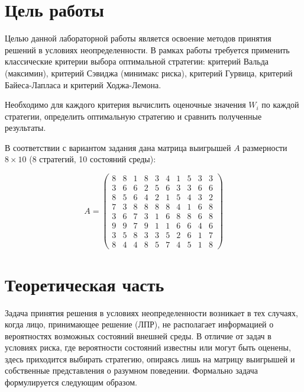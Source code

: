 

\section{Цель работы}

Целью данной лабораторной работы является освоение методов принятия решений в условиях неопределенности. В рамках работы требуется применить классические критерии выбора оптимальной стратегии: критерий Вальда (максимин), критерий Сэвиджа (минимакс риска), критерий Гурвица, критерий Байеса-Лапласа и критерий Ходжа-Лемона.

Необходимо для каждого критерия вычислить оценочные значения $W_i$ по каждой стратегии, определить оптимальную стратегию и сравнить полученные результаты.

В соответствии с вариантом задания дана матрица выигрышей $A$ размерности $8 \times 10$ (8 стратегий, 10 состояний среды):

\[
A = \begin{pmatrix}
8 & 8 & 1 & 8 & 3 & 4 & 1 & 5 & 3 & 3 \\
3 & 6 & 6 & 2 & 5 & 6 & 3 & 3 & 6 & 6 \\
8 & 5 & 6 & 4 & 2 & 1 & 5 & 4 & 3 & 2 \\
7 & 3 & 8 & 8 & 8 & 8 & 4 & 1 & 6 & 8 \\
3 & 6 & 7 & 3 & 1 & 6 & 8 & 8 & 6 & 8 \\
9 & 9 & 7 & 9 & 1 & 1 & 6 & 6 & 4 & 6 \\
3 & 5 & 8 & 3 & 3 & 5 & 2 & 6 & 1 & 7 \\
8 & 4 & 4 & 8 & 5 & 7 & 4 & 5 & 1 & 8
\end{pmatrix}
\]

\clearpage







\section{Теоретическая часть}

Задача принятия решения в условиях неопределенности возникает в тех случаях, когда лицо, принимающее решение (ЛПР), не располагает информацией о вероятностях возможных состояний внешней среды. В отличие от задач в условиях риска, где вероятности состояний известны или могут быть оценены, здесь приходится выбирать стратегию, опираясь лишь на матрицу выигрышей и собственные представления о разумном поведении. Формально задача формулируется следующим образом.

